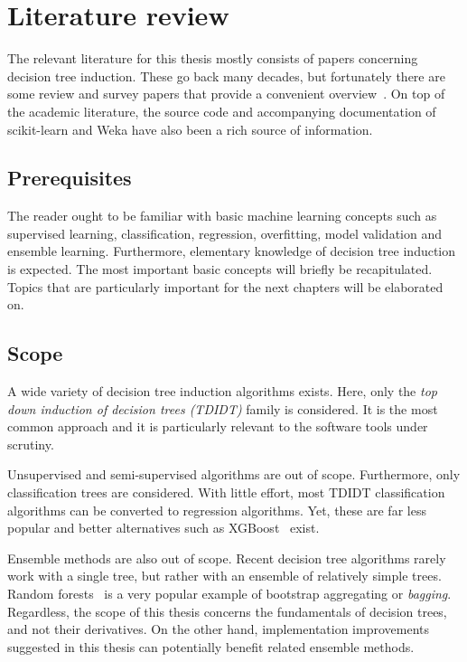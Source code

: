 \chapter{Literature review}\label{cha:literature}
The relevant literature for this thesis mostly consists of papers concerning decision tree induction. These go back many decades, but fortunately there are some review and survey papers that provide a convenient overview~\cite{murthy1998automatic, rokach2005top, kotsiantis2007supervised}. On top of the academic literature, the source code and accompanying documentation of scikit-learn and Weka have also been a rich source of information.

\section{Prerequisites}
The reader ought to be familiar with basic machine learning concepts such as supervised learning, classification, regression, overfitting, model validation and ensemble learning. Furthermore, elementary knowledge of decision tree induction is expected. The most important basic concepts will briefly be recapitulated. Topics that are particularly important for the next chapters will be elaborated on.

\section{Scope}
A wide variety of decision tree induction algorithms exists. Here, only the \emph{top down induction of decision trees (TDIDT)} family is considered. It is the most common approach and it is particularly relevant to the software tools under scrutiny.

Unsupervised and semi-supervised algorithms are out of scope. Furthermore, only classification trees are considered. With little effort, most TDIDT classification algorithms can be converted to regression algorithms. Yet, these are far less popular and better alternatives such as XGBoost~\cite{xgboost} exist.

Ensemble methods are also out of scope. Recent decision tree algorithms rarely work with a single tree, but rather with an ensemble of relatively simple trees. Random forests~\cite{rf} is a very popular example of bootstrap aggregating or \emph{bagging}. Regardless, the scope of this thesis concerns the fundamentals of decision trees, and not their derivatives. On the other hand, implementation improvements suggested in this thesis can potentially benefit related ensemble methods.

